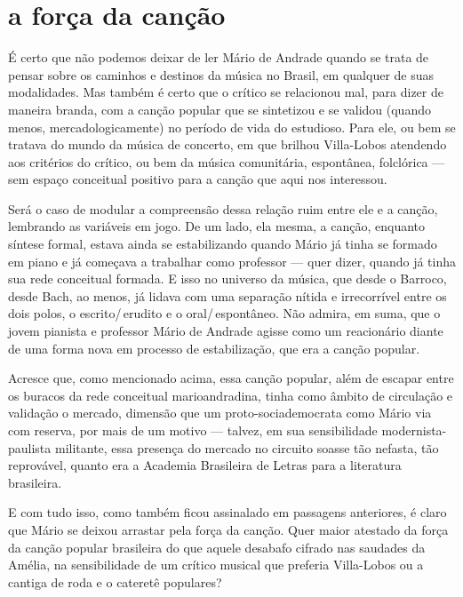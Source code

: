 \section{a força da canção}

É certo que não podemos deixar de ler Mário de Andrade quando se trata
de pensar sobre os caminhos e destinos da música no Brasil, em qualquer
de suas modalidades. Mas também é certo que o crítico se relacionou mal,
para dizer de maneira branda, com a canção popular que se sintetizou e
se validou (quando menos, mercadologicamente) no período de vida do
estudioso. Para ele, ou bem se tratava do mundo da música de concerto,
em que brilhou Villa-Lobos atendendo aos critérios do crítico, ou bem da
música comunitária, espontânea, folclórica --- sem espaço conceitual
positivo para a canção que aqui nos interessou.

Será o caso de modular a compreensão dessa relação ruim entre ele e a
canção, lembrando as variáveis em jogo. De um lado, ela mesma, a canção,
enquanto síntese formal, estava ainda se estabilizando quando Mário já
tinha se formado em piano e já começava a trabalhar como professor ---
quer dizer, quando já tinha sua rede conceitual formada. E isso no
universo da música, que desde o Barroco, desde Bach, ao menos, já lidava
com uma separação nítida e irrecorrível entre os dois polos, o
escrito/\,erudito e o oral/\,espontâneo. Não admira, em suma, que o jovem
pianista e professor Mário de Andrade agisse como um reacionário diante
de uma forma nova em processo de estabilização, que era a canção
popular.

Acresce que, como mencionado acima, essa canção popular, além de escapar
entre os buracos da rede conceitual marioandradina, tinha como âmbito de
circulação e validação o mercado, dimensão que um proto-sociademocrata
como Mário via com reserva, por mais de um motivo --- talvez, em sua
sensibilidade modernista-paulista militante, essa presença do mercado no
circuito soasse tão nefasta, tão reprovável, quanto era a Academia
Brasileira de Letras para a literatura brasileira.

E com tudo isso, como também ficou assinalado em passagens anteriores, é
claro que Mário se deixou arrastar pela força da canção. Quer maior
atestado da força da canção popular brasileira do que aquele desabafo
cifrado nas saudades da Amélia, na sensibilidade de um crítico musical
que preferia Villa-Lobos ou a cantiga de roda e o cateretê populares?
